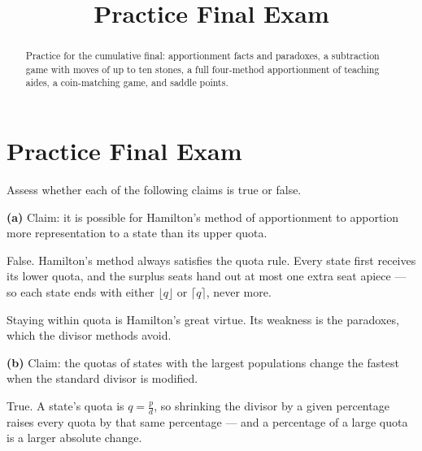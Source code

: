\documentclass[12pt]{ximera}
\title{Practice Final Exam}
\begin{document}
\begin{abstract}
Practice for the cumulative final: apportionment facts and paradoxes, a subtraction game
with moves of up to ten stones, a full four-method apportionment of teaching aides, a
coin-matching game, and saddle points.
\end{abstract}
\maketitle

\section*{Practice Final Exam}

\begin{problem}
Assess whether each of the following claims is true or false.

\begin{prompt}
\textbf{(a)} Claim: it is possible for Hamilton's method of apportionment to apportion
more representation to a state than its upper quota.

\begin{multipleChoice}
\end{multipleChoice}

\begin{feedback}
False. Hamilton's method always satisfies the quota rule. Every state first receives its
lower quota, and the surplus seats hand out at most one extra seat apiece --- so each
state ends with either $\lfloor q\rfloor$ or $\lceil q\rceil$, never more.

Staying within quota is Hamilton's great virtue. Its weakness is the paradoxes, which
the divisor methods avoid.
\end{feedback}
\end{prompt}

\begin{prompt}
\textbf{(b)} Claim: the quotas of states with the largest populations change the fastest
when the standard divisor is modified.

\begin{multipleChoice}
\end{multipleChoice}

\begin{feedback}
True. A state's quota is $q = \frac{p}{d}$, so shrinking the divisor by a given
percentage raises every quota by that same percentage --- and a percentage of a large
quota is a larger absolute change.


\end{feedback}
\end{prompt}
\end{problem}
\end{document}
